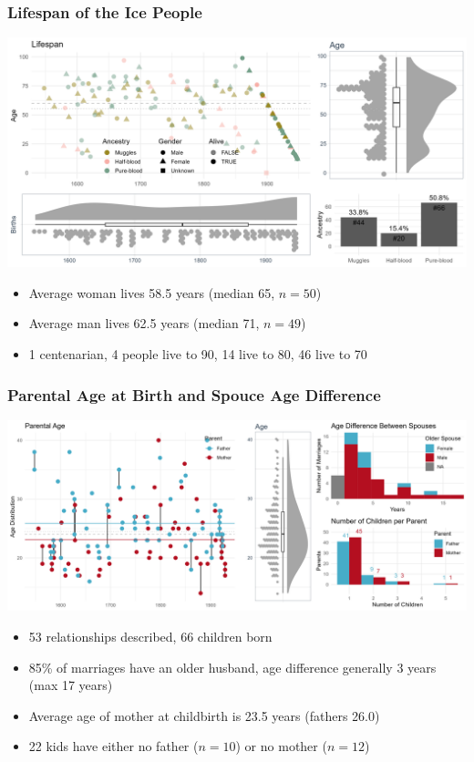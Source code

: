 \begin{frame}
    \frametitle{Lifespan of the Ice People}
    \includegraphics[width=\textwidth]{../R/figures/family_birth}
    \begin{itemize}
        \item Average woman lives 58.5 years (median 65, $n=50$)
        \item Average man lives 62.5 years (median 71, $n=49$)
        \item 1 centenarian, 4 people live to 90, 14 live to 80, 46 live to 70
    \end{itemize}
\end{frame}

\begin{frame}
    \frametitle{Parental Age at Birth and Spouce Age Difference}
    \includegraphics[width=\textwidth]{../R/figures/family_parent_age}
    \begin{itemize}
        \item 53 relationships described, 66 children born
        \item 85\% of marriages have an older husband, age difference generally 3 years (max 17 years)
        \item Average age of mother at childbirth is 23.5 years (fathers 26.0)
        \item 22 kids have either no father ($n=10$) or no mother ($n=12$)
    \end{itemize}
\end{frame}
